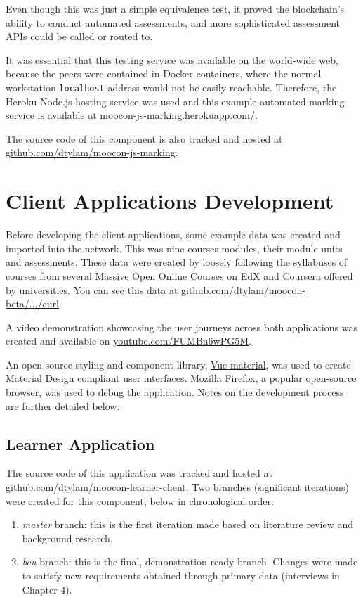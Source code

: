 Even though this was just a simple equivalence test, it proved the blockchain's ability to conduct automated assessments, 
and more sophisticated assessment APIs could be called or routed to.

It was essential that this testing service was available on the world-wide web, because the peers were contained in Docker
containers, where the normal workstation \texttt{localhost} address would not be easily reachable. Therefore, the Heroku Node.js 
hosting service was used and this example automated marking service is available at 
\href{https://moocon-js-marking.herokuapp.com/}{\underline{moocon-js-marking.herokuapp.com/}}.

The source code of this component is also tracked and hosted at 
\href{https://github.com/dtylam/moocon-js-marking}{\underline{github.com/dtylam/moocon-js-marking}}.

\section{Client Applications Development}

Before developing the client applications, some example data was created and imported into the network. 
This was nine courses modules, their module units and assessments. These data were created by loosely following 
the syllabuses of courses from several Massive Open Online Courses on EdX and Coursera offered by universities.
You can see this data at \href{https://github.com/dtylam/moocon-beta/tree/bcu/curl}{\underline{github.com/dtylam/moocon-beta/.../curl}}.

A video demonstration showcasing the user journeys across both applications was created and 
available on \href{https://youtu.be/FUMBn6wPG5M}{\underline{youtube.com/FUMBn6wPG5M}}.

An open source styling and component library, \href{https://vuematerial.io/}{Vue-material}, was used to 
create Material Design compliant user interfaces. 
Mozilla Firefox, a popular open-source browser, was used to debug the application.
Notes on the development process are further detailed below.

\subsection{Learner Application}

The source code of this application was tracked and hosted at 
\href{https://github.com/dtylam/moocon-learner-client}{\underline{github.com/dtylam/moocon-learner-client}}.
Two branches (significant iterations) were created for this component, below in chronological order:
\begin{enumerate}
	\setlength\itemsep{0em}
	\item \textit{master} branch: this is the first iteration made based on literature review and background research.
	\item \textit{bcu} branch: this is the final, demonstration ready branch. 
	Changes were made to satisfy new requirements obtained through primary data (interviews in Chapter 4).
\end{enumerate}

